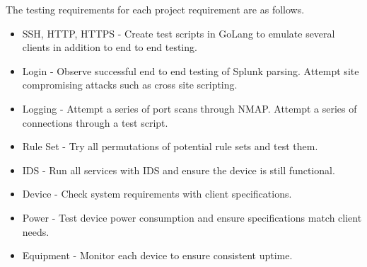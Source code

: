 The testing requirements for each project requirement are as follows.
\begin{itemize}
\item SSH, HTTP, HTTPS - Create test scripts in GoLang to emulate several clients in addition to end to end testing.
\item Login - Observe successful end to end testing of Splunk parsing. Attempt site compromising attacks such as cross site scripting.
\item Logging - Attempt a series of port scans through NMAP. Attempt a series of connections through a test script.
\item Rule Set - Try all permutations of potential rule sets and test them.
\item IDS - Run all services with IDS and ensure the device is still functional.
\item Device - Check system requirements with client specifications. 
\item Power - Test device power consumption and ensure specifications match client needs.
\item Equipment - Monitor each device to ensure consistent uptime.
\end{itemize}
